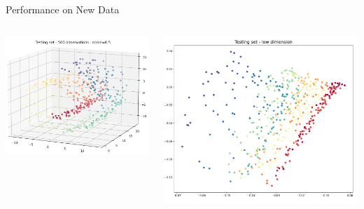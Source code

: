 \documentclass{beamer}
\begin{document}
\begin{frame}{Performance on New Data}
    \begin{columns} %
        \begin{column}{.5\textwidth} %
            \includegraphics[width=1\linewidth]{images/test_h.png}
        \end{column}
        \begin{column}{.5\textwidth} %
            \includegraphics[width=1\linewidth]{images/test_l.png}
        \end{column}
    \end{columns}
\end{frame}
\end{document}
